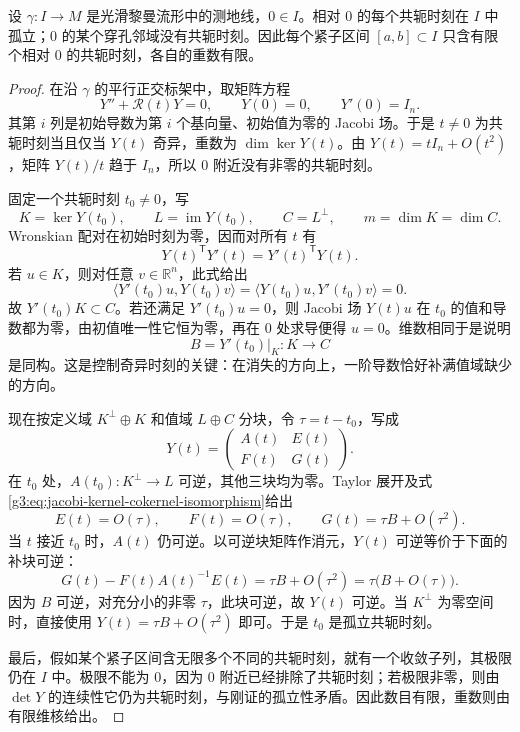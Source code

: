 \begin{proposition}\label{g3:prop:conjugate-times-isolated}
	设 \(\gamma:I\to M\) 是光滑黎曼流形中的测地线，\(0\in I\)。相对 \(0\) 的每个共轭时刻在 \(I\) 中孤立；\(0\) 的某个穿孔邻域没有共轭时刻。因此每个紧子区间 \([a,b]\subset I\) 只含有限个相对 \(0\) 的共轭时刻，各自的重数有限。
\end{proposition}
\begin{proof}
	在沿 \(\gamma\) 的平行正交标架中，取矩阵方程
	\[
		Y''+\mathcal R(t)Y=0,\qquad Y(0)=0,\qquad Y'(0)=I_n.
	\]
	其第 \(i\) 列是初始导数为第 \(i\) 个基向量、初始值为零的 Jacobi 场。于是 \(t\ne0\) 为共轭时刻当且仅当 \(Y(t)\) 奇异，重数为 \(\dim\ker Y(t)\)。由 \(Y(t)=tI_n+O(t^2)\)，矩阵 \(Y(t)/t\) 趋于 \(I_n\)，所以 \(0\) 附近没有非零的共轭时刻。

	固定一个共轭时刻 \(t_0\ne0\)，写
	\[
		K=\ker Y(t_0),\qquad L=\operatorname{im}Y(t_0),
		\qquad C=L^\perp,\qquad m=\dim K=\dim C.
	\]
	Wronskian 配对在初始时刻为零，因而对所有 \(t\) 有
	\begin{equation}\label{g3:eq:jacobi-matrix-wronskian}
		Y(t)^{\mathsf T}Y'(t)=Y'(t)^{\mathsf T}Y(t).
	\end{equation}
	若 \(u\in K\)，则对任意 \(v\in\mathbb R^n\)，此式给出
	\[
		\langle Y'(t_0)u,Y(t_0)v\rangle
		=\langle Y(t_0)u,Y'(t_0)v\rangle=0.
	\]
	故 \(Y'(t_0)K\subset C\)。若还满足 \(Y'(t_0)u=0\)，则 Jacobi 场 \(Y(t)u\) 在 \(t_0\) 的值和导数都为零，由初值唯一性它恒为零，再在 \(0\) 处求导便得 \(u=0\)。维数相同于是说明
	\begin{equation}\label{g3:eq:jacobi-kernel-cokernel-isomorphism}
		B=Y'(t_0)|_K:K\longrightarrow C
	\end{equation}
	是同构。这是控制奇异时刻的关键：在消失的方向上，一阶导数恰好补满值域缺少的方向。

	现在按定义域 \(K^\perp\oplus K\) 和值域 \(L\oplus C\) 分块，令 \(\tau=t-t_0\)，写成
	\[
		Y(t)=\begin{pmatrix}A(t)&E(t)\\ F(t)&G(t)\end{pmatrix}.
	\]
	在 \(t_0\) 处，\(A(t_0):K^\perp\to L\) 可逆，其他三块均为零。Taylor 展开及式\eqref{g3:eq:jacobi-kernel-cokernel-isomorphism}给出
	\[
		E(t)=O(\tau),\qquad F(t)=O(\tau),\qquad
		G(t)=\tau B+O(\tau^2).
	\]
	当 \(t\) 接近 \(t_0\) 时，\(A(t)\) 仍可逆。以可逆块矩阵作消元，\(Y(t)\) 可逆等价于下面的补块可逆：
	\begin{equation}\label{g3:eq:jacobi-singular-block}
		G(t)-F(t)A(t)^{-1}E(t)
		=\tau B+O(\tau^2)=\tau\bigl(B+O(\tau)\bigr).
	\end{equation}
	因为 \(B\) 可逆，对充分小的非零 \(\tau\)，此块可逆，故 \(Y(t)\) 可逆。当 \(K^\perp\) 为零空间时，直接使用 \(Y(t)=\tau B+O(\tau^2)\) 即可。于是 \(t_0\) 是孤立共轭时刻。

	最后，假如某个紧子区间含无限多个不同的共轭时刻，就有一个收敛子列，其极限仍在 \(I\) 中。极限不能为 \(0\)，因为 \(0\) 附近已经排除了共轭时刻；若极限非零，则由 \(\det Y\) 的连续性它仍为共轭时刻，与刚证的孤立性矛盾。因此数目有限，重数则由有限维核给出。
\end{proof}

